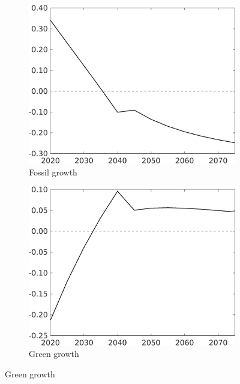 \begin{figure}[h!!!]
\begin{subfigure}{0.32\textwidth}
\end{subfigure}
\begin{subfigure}{0.32\textwidth}
\caption{Fossil growth}
\includegraphics[width=1\textwidth]{../../codding_model/own_basedOnFried/optimalPol_010922_revision/figures/all_13Sept22_Tplus30/gAf_OPT_COMPtaulPer_regime4_spillover0_knspil0_noskill0_sep0_xgrowth0_PV1_etaa0.79.png}
\end{subfigure}
\begin{subfigure}{0.32\textwidth}
	\caption{Green growth}
	\includegraphics[width=1\textwidth]{../../codding_model/own_basedOnFried/optimalPol_010922_revision/figures/all_13Sept22_Tplus30/gAg_OPT_COMPtaulPer_regime4_spillover0_knspil0_noskill0_sep0_xgrowth0_PV1_etaa0.79.png}

\end{subfigure}
\end{figure}
